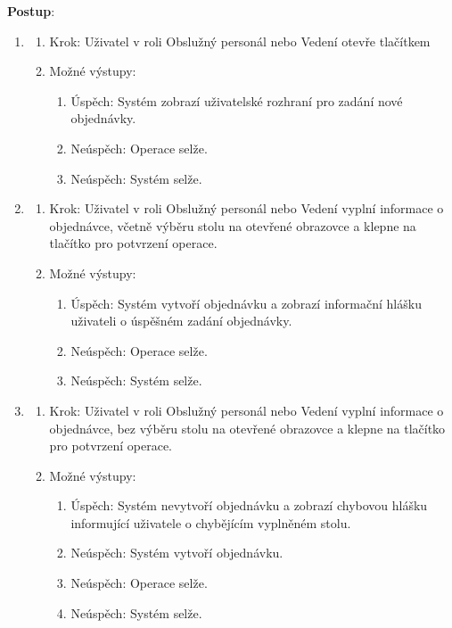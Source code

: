 \documentclass[a4paper,10pt]{article}
\begin{document}
\textbf{Postup}:
\begin{enumerate}
	\item 
	\begin{enumerate}
		\item Krok: Uživatel v roli Obslužný personál nebo Vedení otevře tlačítkem 
		\item Možné výstupy:
		\begin{enumerate}
			\item Úspěch: Systém zobrazí uživatelské rozhraní pro zadání nové objednávky.
			\item Neúspěch: Operace selže. 
			\item Neúspěch: Systém selže. 
		\end{enumerate} 
	\end{enumerate}

	\item 
	\begin{enumerate}
		\item Krok: Uživatel v roli Obslužný personál nebo Vedení vyplní informace o objednávce, včetně výběru stolu na otevřené obrazovce a klepne na tlačítko  pro potvrzení operace.
		\item Možné výstupy:
		\begin{enumerate}
			\item Úspěch: Systém vytvoří objednávku a zobrazí informační hlášku uživateli o úspěšném zadání objednávky.
			\item Neúspěch: Operace selže.
			\item Neúspěch: Systém selže.
		\end{enumerate} 
	\end{enumerate}

	\item 
	\begin{enumerate}
		\item Krok: Uživatel v roli Obslužný personál nebo Vedení vyplní informace o objednávce, bez výběru stolu na otevřené obrazovce a klepne na tlačítko  pro potvrzení operace.
		\item Možné výstupy:
		\begin{enumerate}
			\item Úspěch: Systém nevytvoří objednávku a zobrazí chybovou hlášku informující uživatele o chybějícím vyplněném stolu.
			\item Neúspěch: Systém vytvoří objednávku.
			\item Neúspěch: Operace selže.
			\item Neúspěch: Systém selže.
		\end{enumerate} 
	\end{enumerate}


\end{enumerate}
\end{document}
